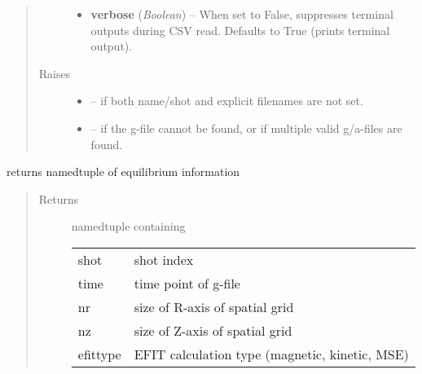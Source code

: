\documentclass[letterpaper,10pt,english]{sphinxmanual}
\begin{document}
\begin{fulllineitems}
\begin{quote}
\begin{description}
\begin{itemize}
\item {} 
\textbf{verbose} (\emph{Boolean}) --
When set to False, suppresses terminal outputs during
CSV read.  Defaults to True (prints terminal output).

\end{itemize}

\item[{Raises}] \leavevmode\begin{itemize}
\item {} 
 -- 
if both name/shot and explicit filenames are not set.

\item {} 
 -- 
if the g-file cannot be found, or if multiple valid
g/a-files are found.

\end{itemize}

\end{description}\end{quote}

\begin{fulllineitems}
\label{eqtools:eqtools.eqdskreader.EqdskReader.getInfo}
returns namedtuple of equilibrium information
\begin{quote}\begin{description}
\item[{Returns}] \leavevmode

namedtuple containing

\begin{tabulary}{\linewidth}{|L|L|}
\hline

shot
 & 
shot index
\\

time
 & 
time point of g-file
\\

nr
 & 
size of R-axis of spatial grid
\\

nz
 & 
size of Z-axis of spatial grid
\\

efittype
 & 
EFIT calculation type (magnetic, kinetic, MSE)
\\
\hline\end{tabulary}



\end{description}\end{quote}

\end{fulllineitems}


\end{fulllineitems}
\end{document}
